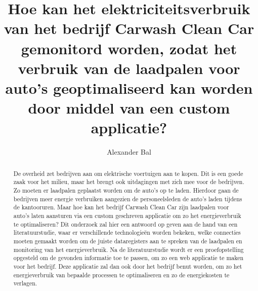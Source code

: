 \documentclass{hogent-article}
\title{Hoe kan het elektriciteitsverbruik van het bedrijf Carwash Clean Car gemonitord worden, zodat het verbruik van de laadpalen voor auto's geoptimaliseerd kan worden door middel van een custom applicatie?}
\author{Alexander Bal}
\begin{document}
\begin{abstract}
  De overheid zet bedrijven aan om elektrische voertuigen aan te kopen. Dit is een goede zaak voor het milieu, maar het brengt ook uitdagingen met zich mee voor de bedrijven. Zo moeten er laadpalen geplaatst worden om de auto's op te laden. Hierdoor gaan de bedrijven meer energie verbruiken aangezien de personeelsleden de  auto's laden tijdens de kantooruren. Maar hoe kan het bedrijf Carwash Clean Car zijn laadpalen voor auto's laten aansturen via een custom geschreven applicatie om zo het energieverbruik te optimaliseren? Dit onderzoek zal hier een antwoord op geven aan de hand van een literatuurstudie, waar er verschillende technologieën worden bekeken, welke connecties moeten gemaakt worden om de juiste dataregisters aan te spreken van de laadpalen en monitoring van het energieverbruik. Na de literatuurstudie wordt er een proefopstelling opgesteld om de gevonden informatie toe te passen, om zo een web applicatie te maken voor het bedrijf. Deze applicatie zal dan ook door het bedrijf benut worden, om zo het energieverbruik van bepaalde processen te optimaliseren en zo de energiekosten te verlagen.
 \end{abstract}

\tableofcontents



\printbibliography[heading=bibintoc]
\end{document}
